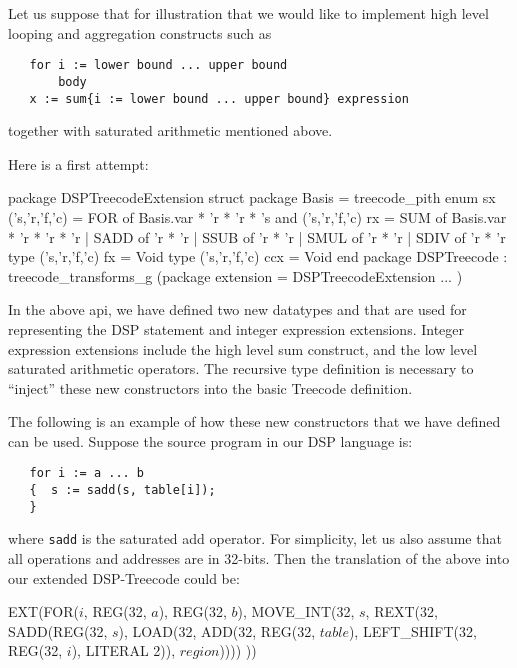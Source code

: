 Let us suppose that for illustration that we would like to
implement high level looping and aggregation constructs such as
\begin{verbatim}
   for i := lower bound ... upper bound
       body
   x := sum{i := lower bound ... upper bound} expression
\end{verbatim}
together with saturated arithmetic mentioned above.

Here is a first attempt:
\begin{SML}
package DSPTreecodeExtension
struct
   package Basis = treecode_pith
   enum sx ('s,'r,'f,'c) = 
      FOR of Basis.var * 'r * 'r * 's
   and ('s,'r,'f,'c) rx = 
      SUM of Basis.var * 'r * 'r * 'r
    | SADD of 'r * 'r
    | SSUB of 'r * 'r
    | SMUL of 'r * 'r
    | SDIV of 'r * 'r
   type ('s,'r,'f,'c) fx = Void
   type ('s,'r,'f,'c) ccx = Void
end
package DSPTreecode : treecode_transforms_g
    (package extension = DSPTreecodeExtension
     ...
    )
\end{SML}
In the above api, we have defined two new datatypes 
and  that are used for representing the DSP statement
and integer expression extensions.  Integer expression extensions
include the high level sum construct, and the low level saturated
arithmetic operators.  The recursive type definition is
necessary to ``inject'' these new constructors into the basic Treecode 
definition.

The following is an example of how these new constructors that we have defined can be used.  Suppose the source program in our DSP language is:
\begin{verbatim}
   for i := a ... b
   {  s := sadd(s, table[i]);
   }
\end{verbatim}
\noindent where \verb|sadd| is the saturated add operator.
For simplicity, let us also assume that all operations and addresses
are in 32-bits.
Then the translation of the above into our extended DSP-Treecode could be:
\begin{SML}
   EXT(FOR(\(i\), REG(32, \(a\)), REG(32, \(b\)),
           MOVE_INT(32, \(s\), REXT(32, SADD(REG(32, \(s\)), 
                LOAD(32, 
                    ADD(32, REG(32, \(table\)), 
                        LEFT_SHIFT(32, REG(32, \(i\)), LITERAL 2)),
                         \(region\)))))
          ))
\end{SML}

